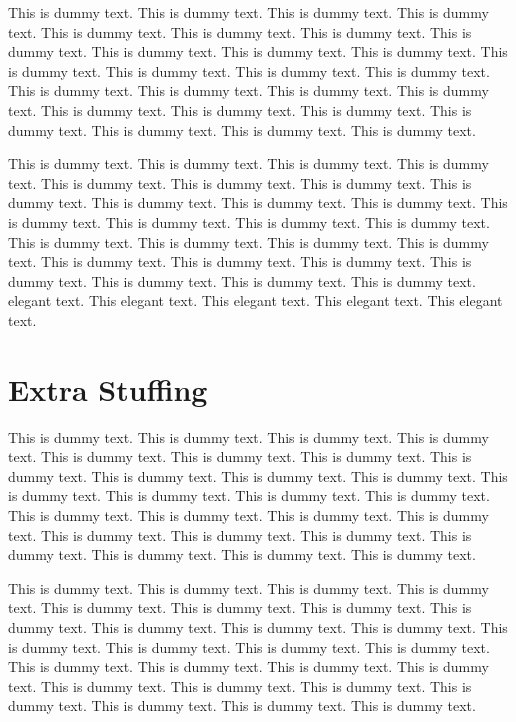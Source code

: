 \documentclass{book}
\begin{document}
This is dummy text. This is dummy text. This is dummy text. This is dummy text. This is dummy text. This is dummy text. This is dummy text. This is dummy text. This is dummy text. This is dummy text. This is dummy text. This is dummy text. This is dummy text. This is dummy text. This is dummy text. This is dummy text. This is dummy text. This is dummy text. This is dummy text. This is dummy text. This is dummy text. This is dummy text. This is dummy text. This is dummy text. This is dummy text. This is dummy text. 

This is dummy text. This is dummy text. This is dummy text. This is dummy text. This is dummy text. This is dummy text. This is dummy text. This is dummy text. This is dummy text. This is dummy text. This is dummy text. This is dummy text. This is dummy text. This is dummy text. This is dummy text. This is dummy text. This is dummy text. This is dummy text. This is dummy text. This is dummy text. This is dummy text. This is dummy text. This is dummy text. This is dummy text. This is dummy text. This is dummy text. elegant text. This elegant text. This elegant text. This elegant text. This elegant text. 

\chapter{Extra Stuffing}\label{Stuffing}
This is dummy text. This is dummy text. This is dummy text. This is dummy text. This is dummy text. This is dummy text. This is dummy text. This is dummy text. This is dummy text. This is dummy text. This is dummy text. This is dummy text. This is dummy text. This is dummy text. This is dummy text. This is dummy text. This is dummy text. This is dummy text. This is dummy text. This is dummy text. This is dummy text. This is dummy text. This is dummy text. This is dummy text. This is dummy text. This is dummy text. 

This is dummy text. This is dummy text. This is dummy text. This is dummy text. This is dummy text. This is dummy text. This is dummy text. This is dummy text. This is dummy text. This is dummy text. This is dummy text. This is dummy text. This is dummy text. This is dummy text. This is dummy text. This is dummy text. This is dummy text. This is dummy text. This is dummy text. This is dummy text. This is dummy text. This is dummy text. This is dummy text. This is dummy text. This is dummy text. This is dummy text. 

\backmatter

\nocite{*}

\end{document}
